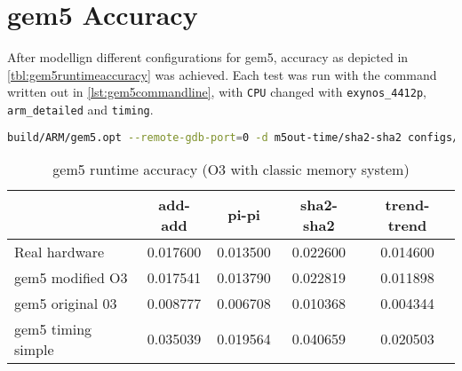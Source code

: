 \section{gem5 Accuracy}

After modellign different configurations for gem5, accuracy as depicted in \autoref{tbl:gem5runtimeaccuracy}
was achieved. Each test was run with the command written out in \autoref{lst:gem5commandline}, with \texttt{CPU}
changed with  \texttt{exynos\_4412p}, \texttt{arm\_detailed} and \texttt{timing}.

\begin{lstlisting}[language=sh,label={lst:gem5commandline},caption={gem5 Command Line}]
build/ARM/gem5.opt --remote-gdb-port=0 -d m5out-time/sha2-sha2 configs/example/se.py -c bin/sha2/sha2 --cpu-type=CPU --mem-type=LPDDR2_S4_800_x32 --sys-clock=440MHz --cpu-clock=1700MHz --num-l3caches=0 --caches --l2cache --l2_assoc=16 --l2_size=1MB --l1d_size=32kB --mem-size=2048MB --l1d_assoc=4 --l1i_assoc=4
\end{lstlisting}


\begin{table}
\centering
\begin{tabular}{|l|c|c|c|c|}
\hline
 & add-add & pi-pi & sha2-sha2 & trend-trend \\
\hline
Real hardware & 0.017600  & 0.013500 & 0.022600 & 0.014600 \\
gem5 modified O3    & 0.017541 & 0.013790 & 0.022819 & 0.011898 \\
gem5 original 03    & 0.008777 & 0.006708 & 0.010368 & 0.004344 \\
gem5 timing simple  & 0.035039 & 0.019564 & 0.040659 & 0.020503 \\
\hline
\end{tabular}
\caption{gem5 runtime accuracy (O3 with classic memory system)}
\label{tbl:gem5runtimeaccuracy}
\end{table}
